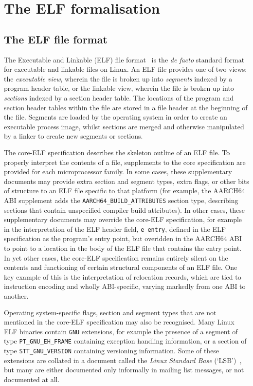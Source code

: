 \section{The ELF formalisation}
\label{sect.elf.formalisation}

\subsection{The ELF file format}
\label{subsect.elf.file.format}

The Executable and Linkable (ELF) file format~\cite{elf-sco-model} is the \emph{de facto} standard format for executable and linkable files on Linux.
An ELF file provides one of two views: the \emph{executable view}, wherein the file is broken up into \emph{segments} indexed by a program header table, or the linkable view, wherein the file is broken up into \emph{sections} indexed by a section header table.
The locations of the program and section header tables within the file are stored in a file header at the beginning of the file.
Segments are loaded by the operating system in order to create an executable process image, whilst sections are merged and otherwise manipulated by a linker to create new segments or sections.

The core-ELF specification describes the skeleton outline of an ELF file.
To properly interpret the contents of a file, supplements to the core specification are provided for each microprocessor family.
In some cases, these supplementary documents may provide extra section and segment types, extra flags, or other bits of structure to an ELF file specific to that platform (for example, the AARCH64 ABI supplement adds the \texttt{AARCH64\_BUILD\_ATTRIBUTES} section type, describing sections that contain unspecified compiler build attributes).
In other cases, these supplementary documents may override the core-ELF specification, for example in the interpretation of the ELF header field, \texttt{e\_entry}, defined in the ELF specification as the program's entry point, but overidden in the AARCH64 ABI to point to a location in the body of the ELF file that contains the entry point.
In yet other cases, the core-ELF specification remains entirely silent on the contents and functioning of certain structural components of an ELF file.
One key example of this is the interpretation of relocation records, which are tied to instruction encoding and wholly ABI-specific, varying markedly from one ABI to another.

Operating system-specific flags, section and segment types that are not mentioned in the core-ELF specification may also be recognised.
Many Linux ELF binaries contain \texttt{GNU} extensions, for example the presence of a segment of type \texttt{PT\_GNU\_EH\_FRAME} containing exception handling information, or a section of type \texttt{STT\_GNU\_VERSION} containing versioning information.
Some of these extensions are collated in a document called the \emph{Linux Standard Base} (`LSB')~\cite{linux-standard-base}, but many are either documented only informally in mailing list messages, or not documented at all.

